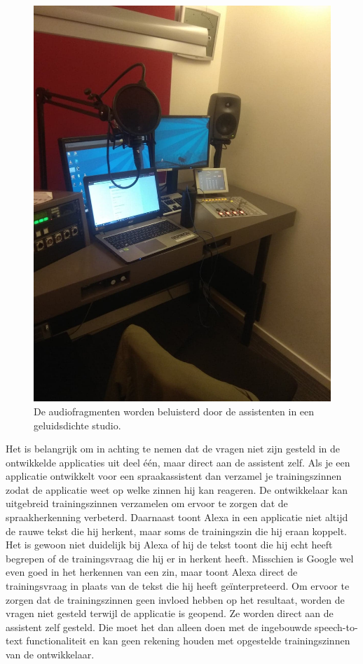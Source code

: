 \begin{figure}[h]
    \includegraphics[width=0.7\linewidth]{img/proefafname3}
    \caption{De audiofragmenten worden beluisterd door de assistenten in een geluidsdichte studio.}
    \label{fig:proefafname2}
\end{figure}

Het is belangrijk om in achting te nemen dat de vragen niet zijn gesteld in de ontwikkelde applicaties uit deel één, maar direct aan de assistent zelf. Als je een applicatie ontwikkelt voor een spraakassistent dan verzamel je trainingszinnen zodat de applicatie weet op welke zinnen hij kan reageren. De ontwikkelaar kan uitgebreid trainingszinnen verzamelen om ervoor te zorgen dat de spraakherkenning verbeterd. Daarnaast toont Alexa in een applicatie niet altijd de rauwe tekst die hij herkent, maar soms de trainingszin die hij eraan koppelt. Het is gewoon niet duidelijk bij Alexa of hij de tekst toont die hij echt heeft begrepen of de trainingsvraag die hij er in herkent heeft. Misschien is Google wel even goed in het herkennen van een zin, maar toont Alexa direct de trainingsvraag in plaats van de tekst die hij heeft geïnterpreteerd.   Om ervoor te zorgen dat de trainingszinnen geen invloed hebben op het resultaat, worden de vragen niet gesteld terwijl de applicatie is geopend. Ze worden direct aan de assistent zelf gesteld. Die moet het dan alleen doen met de ingebouwde speech-to-text functionaliteit en kan geen rekening houden met opgestelde trainingszinnen van de ontwikkelaar.

